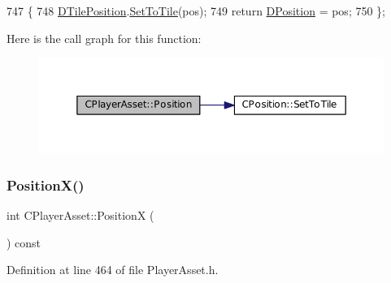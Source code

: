 \begin{DoxyCode}
747                                                     \{
748     \hyperlink{classCPlayerAsset_a5b59a9d3b7db8c7fa194b80dafb96186}{DTilePosition}.\hyperlink{classCPosition_ae302aa21792de64c97de29e2cbbfeb94}{SetToTile}(pos);
749     \textcolor{keywordflow}{return} \hyperlink{classCPlayerAsset_aa9f53c009b181c7c5647c6b03776a04c}{DPosition} = pos;
750 \};
\end{DoxyCode}
Here is the call graph for this function\+:
\nopagebreak
\begin{figure}[H]
\begin{center}
\leavevmode
\includegraphics[width=350pt]{classCPlayerAsset_a8c3ed4ab81f79aa28faec6bf790a0a79_cgraph}
\end{center}
\end{figure}
\hypertarget{classCPlayerAsset_a9cf8961ac97f2928d1e08bc4f311f220}{}\label{classCPlayerAsset_a9cf8961ac97f2928d1e08bc4f311f220} 
\subsubsection{\texorpdfstring{Position\+X()}{PositionX()}\hspace{0.1cm}{\footnotesize\ttfamily [1/2]}}
{\footnotesize\ttfamily int C\+Player\+Asset\+::\+PositionX (\begin{DoxyParamCaption}{ }\end{DoxyParamCaption}) const\hspace{0.3cm}{\ttfamily [inline]}}



Definition at line 464 of file Player\+Asset.\+h.


